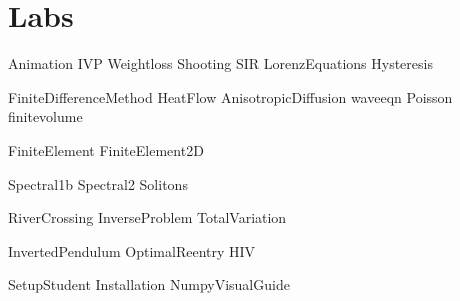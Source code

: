 \documentclass[opener-c,labs,green,nociteref]{HJnewsiambook}
\begin{document}
\part{Labs}
{Animation}
{IVP}
{Weightloss}
{Shooting}
{SIR}
{LorenzEquations}
{Hysteresis}

{FiniteDifferenceMethod}
{HeatFlow}
{AnisotropicDiffusion}
{waveeqn}
{Poisson}
{finitevolume}

{FiniteElement}
{FiniteElement2D}

{Spectral1b}
{Spectral2}
{Solitons}

{RiverCrossing}
{InverseProblem}
{TotalVariation}

{InvertedPendulum}
{OptimalReentry}
{HIV}

\begin{appendices}
{SetupStudent}
{Installation}
{NumpyVisualGuide}
\end{appendices}



\end{document}
